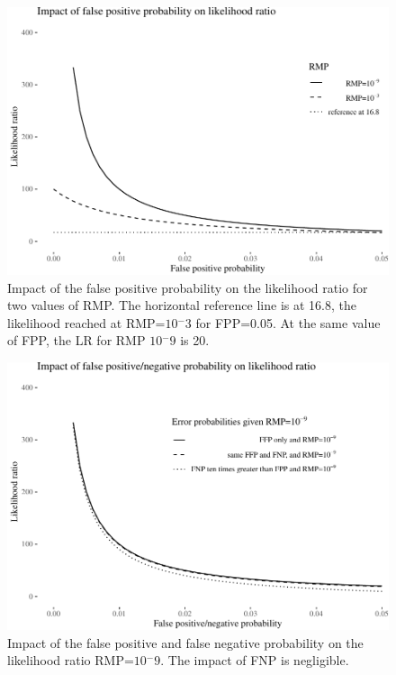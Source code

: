 \documentclass[
  10pt,
  dvipsnames,enabledeprecatedfontcommands]{scrartcl}
\begin{document}
\begin{figure}

\begin{center}\includegraphics[width=1\linewidth]{lr-chapter4_files/figure-latex/fig-fpplr-1} \end{center}
\caption{Impact of the false positive probability on the likelihood ratio for two values of RMP. The horizontal reference line is at 16.8, the likelihood reached at RMP=$10{^-3}$ for FPP=0.05. At the same value of FPP, the LR for RMP $10{^-9}$ is 20.}
\label{fig:fpplr}
\end{figure}

\begin{figure}

\begin{center}\includegraphics[width=1\linewidth]{lr-chapter4_files/figure-latex/fig-fpfnplr-1} \end{center}
\caption{Impact of the false positive and false negative probability on the likelihood ratio RMP=$10{^-9}$. The impact of FNP is negligible.}
\label{fig:fpfnplr}
\end{figure}
\end{document}
